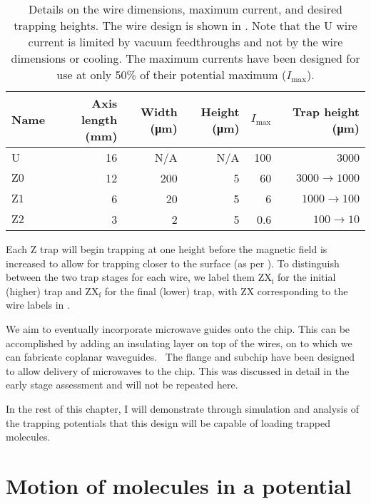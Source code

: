 %
\begin{table}
  \centering
\begin{tabular}{lrrrrr}
  Name & Axis length (\si{\milli\meter}) & Width (\si{\micro\meter})& Height
  (\si{\micro\meter})& $I_\text{max}$ & Trap height (\si{\micro\meter}) \\
 \hline
  U & 16 & N/A& N/A& 100 & 3000\\
  $\mathrm{Z0}$ & 12 & 200&  5& 60& $3000\rightarrow1000$ \\
  $\mathrm{Z1}$ &  6 & 20&  5& 6& $1000\rightarrow100$ \\
  $\mathrm{Z2}$ &  3 & 2&  5& 0.6& $100\rightarrow10$ \\
 \hline
\end{tabular}
  \caption{Details on the wire dimensions, maximum current, and desired
  trapping heights. The wire design is shown in
  . Note that the U wire current is
  limited by vacuum feedthroughs and not by the wire dimensions or cooling.
  The maximum currents have been designed for use at only 50\% of their
  potential maximum ($I_\text{max}$).
  }
  \label{design:table:wires}
\end{table}

Each Z trap will begin trapping at one height before the magnetic field is
increased to allow for trapping closer to the surface (as per
).  To distinguish between the two trap stages for
each wire, we label them $\mathrm{ZX_i}$ for the initial (higher) trap and
$\mathrm{ZX_f}$ for the final (lower) trap, with $\mathrm{ZX}$ corresponding to
the wire labels in .

We aim to eventually incorporate microwave guides onto the chip. This can be
accomplished by adding an insulating layer on top of the wires, on to which we
can fabricate coplanar waveguides.~\cite{1127105} The flange and subchip have
been designed to allow delivery of microwaves to the chip.  This was discussed in detail in the early stage
assessment and will not be repeated here.

In the rest of this chapter, I will demonstrate through simulation and analysis
of the trapping potentials that this design will be capable of loading trapped
\CaF{} molecules.

\section{Motion of molecules in a potential}

